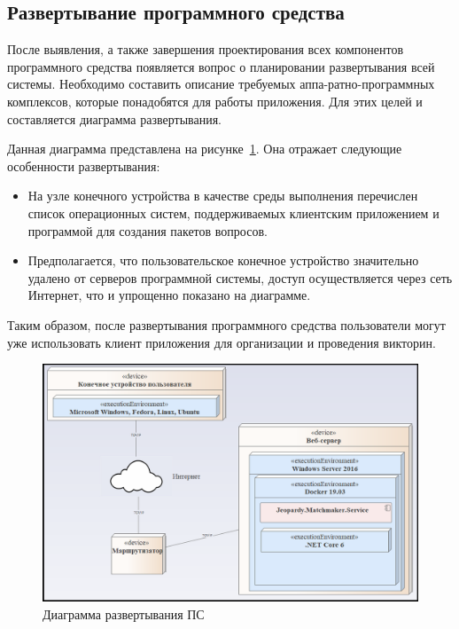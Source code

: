 \subsection{Развертывание программного средства}
\label{sec:design:deployment}

После выявления, а также завершения проектирования всех компонентов программного средства появляется вопрос о планировании развертывания всей системы. 
Необходимо составить описание требуемых аппа-ратно-программных комплексов, которые понадобятся для работы приложения. 
Для этих целей и составляется диаграмма развертывания. 

Данная диаграмма представлена на рисунке~\ref{fig:design:deployment:diagram}. Она отражает следующие особенности развертывания:

\begin{itemize}
	\item На узле конечного устройства в качестве среды выполнения перечислен список операционных систем, поддерживаемых клиентским приложением и программой для создания пакетов вопросов.
	\item Предполагается, что пользовательское конечное устройство зна\-чи\-те\-льно удалено от серверов программной системы, доступ осуществляется через сеть Интернет, что и упрощенно показано на диаграмме.
\end{itemize}

Таким образом, после развертывания программного средства пользователи могут уже использовать клиент приложения для организации и проведения викторин.

\begin{figure}[!ht]
\centering
    \includegraphics[scale=0.6]{attachments/deploy.png}
    \caption{Диаграмма развертывания ПС}
    \label{fig:design:deployment:diagram}
\end{figure}